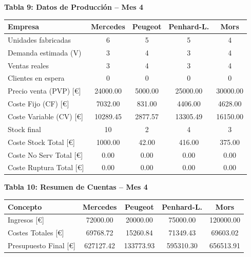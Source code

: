 \documentclass{standalone}
\begin{document}
	\begin{minipage}{1.08\linewidth}
		\centering
		
		\textbf{Tabla 9: Datos de Producción – Mes 4}\\[0.5em]
		\begin{tabular}{@{}l
				S[table-format=2.0]
				S[table-format=2.0]
				S[table-format=2.0]
				S[table-format=2.0]@{}}
			\toprule
			\textbf{Empresa} & \textbf{Mercedes} & \textbf{Peugeot} & \textbf{Penhard-L.} & \textbf{Mors} \\
			\midrule
			Unidades fabricadas & 6 & 5 & 5 & 4 \\
			Demanda estimada (V) & 3 & 4 & 3 & 4 \\
			Ventas reales & 3 & 4 & 3 & 4 \\
			Clientes en espera & 0 & 0 & 0 & 0 \\
			Precio venta (PVP) [\euro] & 24000.00 & 5000.00 & 25000.00 & 30000.00 \\
			Coste Fijo (CF) [\euro] & 7032.00 & 831.00 & 4406.00 & 4628.00 \\
			Coste Variable (CV) [\euro] & 10289.45 & 2877.57 & 13305.49 & 16150.00 \\
			Stock final & 10 & 2 & 4 & 3 \\
			Coste Stock Total [\euro] & 1000.00 & 42.00 & 416.00 & 375.00 \\
			Coste No Serv Total [\euro] & 0.00 & 0.00 & 0.00 & 0.00 \\
			Coste Ruptura Total [\euro] & 0.00 & 0.00 & 0.00 & 0.00 \\
			\bottomrule
		\end{tabular}
		
		\vspace{2em} %
		
		\textbf{Tabla 10: Resumen de Cuentas – Mes 4}\\[0.5em]
		\begin{tabular}{@{}l
				S[table-format=7.2]
				S[table-format=7.2]
				S[table-format=7.2]
				S[table-format=7.2]@{}}
			\toprule
			\textbf{Concepto} & \textbf{Mercedes} & \textbf{Peugeot} & \textbf{Penhard-L.} & \textbf{Mors} \\
			\midrule
			Ingresos [\euro] & 72000.00 & 20000.00 & 75000.00 & 120000.00 \\
			Costes Totales [\euro] & 69768.72 & 15260.84 & 71349.43 & 69603.02 \\
			Presupuesto Final [\euro] & 627127.42 & 133773.93 & 595310.30 & 656513.91 \\
			\bottomrule
		\end{tabular}
		
	\end{minipage}
\end{document}
